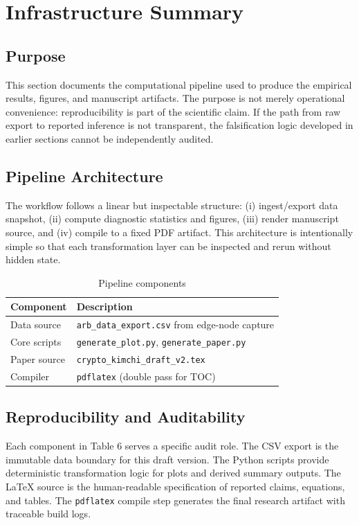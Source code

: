 \documentclass[11pt,a4paper]{article}
\begin{document}
\section{Infrastructure Summary}
\subsection{Purpose}
This section documents the computational pipeline used to produce the empirical results, figures, and manuscript artifacts. The purpose is not merely operational convenience: reproducibility is part of the scientific claim. If the path from raw export to reported inference is not transparent, the falsification logic developed in earlier sections cannot be independently audited.

\subsection{Pipeline Architecture}
The workflow follows a linear but inspectable structure: (i) ingest/export data snapshot, (ii) compute diagnostic statistics and figures, (iii) render manuscript source, and (iv) compile to a fixed PDF artifact. This architecture is intentionally simple so that each transformation layer can be inspected and rerun without hidden state.

\begin{table}[H]
\centering
\caption{Pipeline components}
\begin{tabular}{l l}
\toprule
Component & Description \\
\midrule
Data source & \texttt{arb\_data\_export.csv} from edge-node capture \\
Core scripts & \texttt{generate\_plot.py}, \texttt{generate\_paper.py} \\
Paper source & \texttt{crypto\_kimchi\_draft\_v2.tex} \\
Compiler & \texttt{pdflatex} (double pass for TOC) \\
\bottomrule
\end{tabular}
\end{table}

\subsection{Reproducibility and Auditability}
Each component in Table 6 serves a specific audit role. The CSV export is the immutable data boundary for this draft version. The Python scripts provide deterministic transformation logic for plots and derived summary outputs. The LaTeX source is the human-readable specification of reported claims, equations, and tables. The \texttt{pdflatex} compile step generates the final research artifact with traceable build logs.
\end{document}
